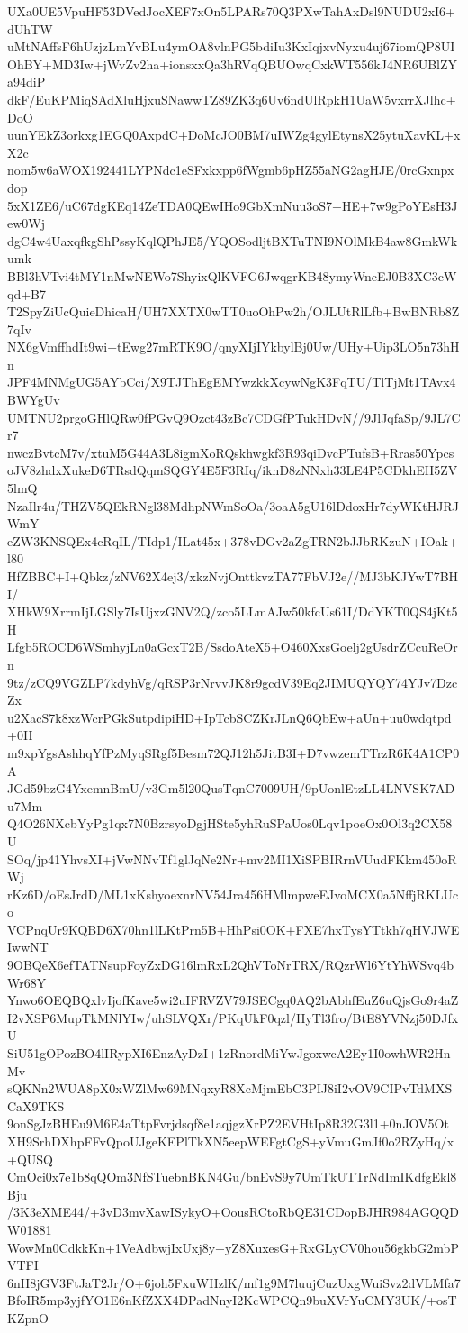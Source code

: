 UXa0UE5VpuHF53DVedJocXEF7xOn5LPARs70Q3PXwTahAxDsl9NUDU2xI6+dUhTW
uMtNAffsF6hUzjzLmYvBLu4ymOA8vlnPG5bdiIu3KxIqjxvNyxu4uj67iomQP8UI
OhBY+MD3Iw+jWvZv2ha+ionsxxQa3hRVqQBUOwqCxkWT556kJ4NR6UBlZYa94diP
dkF/EuKPMiqSAdXluHjxuSNawwTZ89ZK3q6Uv6ndUlRpkH1UaW5vxrrXJlhc+DoO
uunYEkZ3orkxg1EGQ0AxpdC+DoMcJO0BM7uIWZg4gylEtynsX25ytuXavKL+xX2c
nom5w6aWOX192441LYPNdc1eSFxkxpp6fWgmb6pHZ55aNG2agHJE/0rcGxnpxdop
5xX1ZE6/uC67dgKEq14ZeTDA0QEwIHo9GbXmNuu3oS7+HE+7w9gPoYEsH3Jew0Wj
dgC4w4UaxqfkgShPssyKqlQPhJE5/YQOSodljtBXTuTNI9NOlMkB4aw8GmkWkumk
BBl3hVTvi4tMY1nMwNEWo7ShyixQlKVFG6JwqgrKB48ymyWncEJ0B3XC3cWqd+B7
T2SpyZiUcQuieDhicaH/UH7XXTX0wTT0uoOhPw2h/OJLUtRlLfb+BwBNRb8Z7qIv
NX6gVmffhdIt9wi+tEwg27mRTK9O/qnyXIjIYkbylBj0Uw/UHy+Uip3LO5n73hHn
JPF4MNMgUG5AYbCci/X9TJThEgEMYwzkkXcywNgK3FqTU/TlTjMt1TAvx4BWYgUv
UMTNU2prgoGHlQRw0fPGvQ9Ozct43zBc7CDGfPTukHDvN//9JlJqfaSp/9JL7Cr7
nwczBvtcM7v/xtuM5G44A3L8igmXoRQskhwgkf3R93qiDvcPTufsB+Rras50Ypcs
oJV8zhdxXukeD6TRsdQqmSQGY4E5F3RIq/iknD8zNNxh33LE4P5CDkhEH5ZV5lmQ
NzaIlr4u/THZV5QEkRNgl38MdhpNWmSoOa/3oaA5gU16lDdoxHr7dyWKtHJRJWmY
eZW3KNSQEx4cRqIL/TIdp1/ILat45x+378vDGv2aZgTRN2bJJbRKzuN+IOak+l80
HfZBBC+I+Qbkz/zNV62X4ej3/xkzNvjOnttkvzTA77FbVJ2e//MJ3bKJYwT7BHI/
XHkW9XrrmIjLGSly7IsUjxzGNV2Q/zco5LLmAJw50kfcUs61I/DdYKT0QS4jKt5H
Lfgb5ROCD6WSmhyjLn0aGcxT2B/SsdoAteX5+O460XxsGoelj2gUsdrZCcuReOrn
9tz/zCQ9VGZLP7kdyhVg/qRSP3rNrvvJK8r9gcdV39Eq2JIMUQYQY74YJv7DzcZx
u2XacS7k8xzWcrPGkSutpdipiHD+IpTcbSCZKrJLnQ6QbEw+aUn+uu0wdqtpd+0H
m9xpYgsAshhqYfPzMyqSRgf5Besm72QJ12h5JitB3I+D7vwzemTTrzR6K4A1CP0A
JGd59bzG4YxemnBmU/v3Gm5l20QusTqnC7009UH/9pUonlEtzLL4LNVSK7ADu7Mm
Q4O26NXcbYyPg1qx7N0BzrsyoDgjHSte5yhRuSPaUos0Lqv1poeOx0Ol3q2CX58U
SOq/jp41YhvsXI+jVwNNvTf1glJqNe2Nr+mv2MI1XiSPBIRrnVUudFKkm450oRWj
rKz6D/oEsJrdD/ML1xKshyoexnrNV54Jra456HMlmpweEJvoMCX0a5NffjRKLUco
VCPnqUr9KQBD6X70hn1lLKtPrn5B+HhPsi0OK+FXE7hxTysYTtkh7qHVJWEIwwNT
9OBQeX6efTATNsupFoyZxDG16lmRxL2QhVToNrTRX/RQzrWl6YtYhWSvq4bWr68Y
Ynwo6OEQBQxlvIjofKave5wi2uIFRVZV79JSECgq0AQ2bAbhfEuZ6uQjsGo9r4aZ
I2vXSP6MupTkMNlYIw/uhSLVQXr/PKqUkF0qzl/HyTl3fro/BtE8YVNzj50DJfxU
SiU51gOPozBO4lIRypXI6EnzAyDzI+1zRnordMiYwJgoxwcA2Ey1I0owhWR2HnMv
sQKNn2WUA8pX0xWZlMw69MNqxyR8XcMjmEbC3PIJ8iI2vOV9CIPvTdMXSCaX9TKS
9onSgJzBHEu9M6E4aTtpFvrjdsqf8e1aqjgzXrPZ2EVHtIp8R32G3l1+0nJOV5Ot
XH9SrhDXhpFFvQpoUJgeKEPlTkXN5eepWEFgtCgS+yVmuGmJf0o2RZyHq/x+QUSQ
CmOci0x7e1b8qQOm3NfSTuebnBKN4Gu/bnEvS9y7UmTkUTTrNdImIKdfgEkl8Bju
/3K3eXME44/+3vD3mvXawISykyO+OousRCtoRbQE31CDopBJHR984AGQQDW01881
WowMn0CdkkKn+1VeAdbwjIxUxj8y+yZ8XuxesG+RxGLyCV0hou56gkbG2mbPVTFI
6nH8jGV3FtJaT2Jr/O+6joh5FxuWHzlK/mf1g9M7luujCuzUxgWuiSvz2dVLMfa7
BfoIR5mp3yjfYO1E6nKfZXX4DPadNnyI2KcWPCQn9buXVrYuCMY3UK/+osTKZpnO
